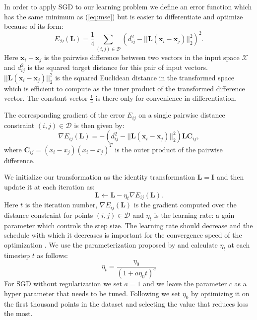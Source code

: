 \documentclass[a4paper,titlepage]{article}
\renewcommand{\vec}[1]{\mathbf{#1}}
\newcommand{\mat}[1]{\mathbf{#1}}
\begin{document}
In order to apply \ac{SGD} to our learning problem we define an error function which has the same minimum as (\ref{eq:mse}) but is easier to differentiate and optimize because of its form:
\begin{equation}
E_{\mathcal{D}}(\mat{L}) =  \frac{1}{4} \sum_{(i,j) \in \mathcal{D}} \left ( d_{ij}^2 - ||\mat{L}(\vec{x}_i - \vec{x}_j)||_2^2 \right )^2.
\label{eq:opt_target}
\end{equation}
Here $\vec{x}_i - \vec{x}_j$ is the pairwise difference between two vectors in the input space $\mathcal{X}$ and $d_{ij}^2$ is the squared target distance for this pair of input vectors. $||\mat{L}(\vec{x}_i - \vec{x}_j)||_2^2$ is the squared Euclidean distance in the transformed space which is efficient to compute as the inner product of the transformed difference vector. The constant vector $\frac{1}{4}$ is there only for convenience in differentiation. 

The corresponding gradient of the error $E_{ij}$ on a single pairwise distance constraint $(i,j) \in \mathcal{D}$ is then given by:
\begin{equation}
\nabla E_{ij}(\mat{L})  = - \left ( d_{ij}^2 - ||\mat{L}(\vec{x}_i - \vec{x}_j)||_2^2 \right) \mat{L} \mat{C}_{ij},
\label{eq:opt_grad}
\end{equation}
where $\mat{C}_{ij} = (x_i - x_j)(x_i - x_j)^T$ is the outer product of the pairwise difference.

We initialize our transformation as the identity transformation $\mat{L} = \mat{I}$ and then update it at each iteration as:
\begin{equation}
\mat{L} \leftarrow \mat{L} - \eta_{t} \nabla E_{ij}(\mat{L}).
\label{eq:update}
\end{equation}
Here $t$ is the iteration number, $\nabla E_{ij}(\mat{L})$ is the gradient computed over the distance constraint for points $(i,j) \in \mathcal{D}$ and $\eta_{t}$ is the learning rate: a gain parameter which controls the step size. The learning rate should decrease and the schedule with which it decreases is important for the convergence speed of the optimization \cite{xu2011towards}. We use the parameterization proposed by \cite{xu2011towards} and calculate $\eta_{t}$ at each timestep $t$ as follows:
\begin{equation}
\eta_{t} = \frac{\eta_0}{\left(1+ a \eta_0 t \right)^c}
\label{eq:eta_update}
\end{equation}
For SGD without regularization we set $a = 1$ and we leave the parameter $c$ as a hyper parameter that needs to be tuned. Following \cite{bottou2008tradeoffs} we set $\eta_0$ by optimizing it on the first thousand points in the dataset and selecting the value that reduces loss the most.
\end{document}

